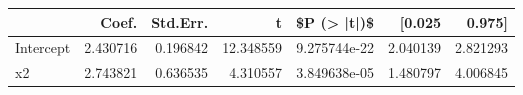 \begin{tabular}{lrrrrrr}
\toprule
{} &     Coef. &  Std.Err. &          t &   \$P (> |t|)\$ &    [0.025 &    0.975] \\
\midrule
Intercept &  2.430716 &  0.196842 &  12.348559 &  9.275744e-22 &  2.040139 &  2.821293 \\
x2        &  2.743821 &  0.636535 &   4.310557 &  3.849638e-05 &  1.480797 &  4.006845 \\
\bottomrule
\end{tabular}
